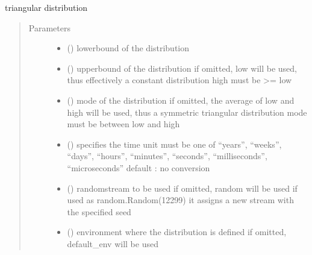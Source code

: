 \documentclass[letterpaper,10pt,english]{sphinxmanual}
\begin{document}
\begin{fulllineitems}
\label{\detokenize{Reference:salabim.Triangular}}
triangular distribution
\begin{quote}\begin{description}
\item[{Parameters}] \leavevmode\begin{itemize}
\item {} 
 () \textendash{} lowerbound of the distribution

\item {} 
 () \textendash{} upperbound of the distribution 
if omitted, low will be used, thus effectively a constant distribution 
high must be \textgreater{}= low

\item {} 
 () \textendash{} mode of the distribution 
if omitted, the average of low and high will be used, thus a symmetric triangular distribution 
mode must be between low and high

\item {} 
 () \textendash{} specifies the time unit 
must be one of “years”, “weeks”, “days”, “hours”, “minutes”, “seconds”, “milliseconds”, “microseconds” 
default : no conversion 

\item {} 
 () \textendash{} randomstream to be used 
if omitted, random will be used 
if used as random.Random(12299)
it assigns a new stream with the specified seed

\item {} 
 ({\hyperref[\detokenize{Reference:salabim.Environment}]{}}) \textendash{} environment where the distribution is defined 
if omitted, default\_env will be used

\end{itemize}

\end{description}\end{quote}


\end{fulllineitems}
\end{document}
